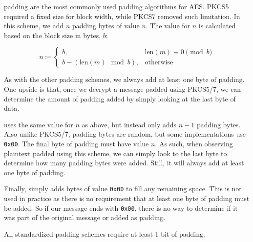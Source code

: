  padding are the most commonly used padding algorithms for AES. PKCS5 required a fixed size for block width, while PKCS7 removed such limitation. In this scheme, we add $n$ padding bytes of value $n$. The value for $n$ is calculated based on the block size in bytes, $b$:

\[ n \coloneq \begin{cases}
    b, & \text{len}(m) \equiv 0 \pmod{b} \\
    b - (\text{len}(m) \mod{b}), & \text{otherwise}
\end{cases}\]


As with the other padding schemes, we always add at least one byte of padding. One upside is that, once we decrypt a message padded using PKCS5/7, we can determine the amount of padding added by simply looking at the last byte of data.

 uses the same value for $n$ as above, but instead only adds $n - 1$ padding bytes. Also unlike PKCS5/7, padding bytes are random, but some implementations use \texttt{0x00}. The final byte of padding must have value $n$. As such, when observing plaintext padded using this scheme, we can simply look to the last byte to determine how many padding bytes were added. Still, it will always add at least one byte of padding.

Finally,  simply adds bytes of value \texttt{0x00} to fill any remaining space. This is not used in practice as there is no requirement that at least one byte of padding must be added. So if our message ends with \texttt{0x00}, there is no way to determine if it was part of the original message or added as padding.

\begin{notebox}
    All standardized padding schemes require at least 1 bit of padding.
\end{notebox}

